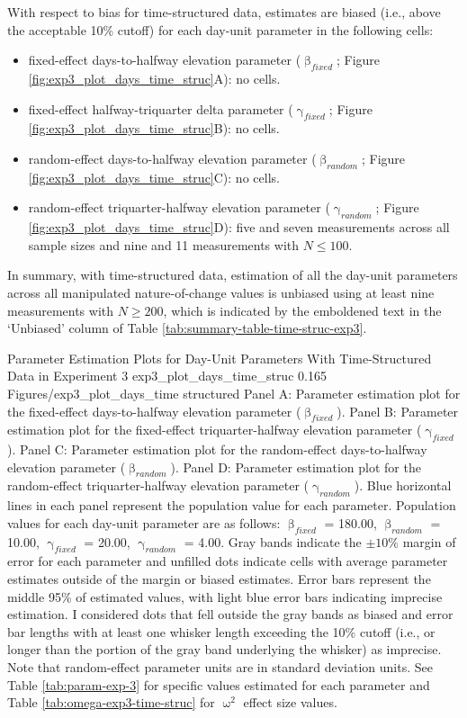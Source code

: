 \documentclass[
12pt, %
twoside,
english]{guelphthesis}
\theoremstyle{definition}
\theoremstyle{definition}
\theoremstyle{definition}
\theoremstyle{definition}
\theoremstyle{remark}
\begin{document}
With respect to bias for time-structured data, estimates are biased (i.e., above the acceptable 10\% cutoff) for each day-unit parameter in the following cells:
\begin{itemize}
\tightlist
\item
  fixed-effect days-to-halfway elevation parameter (\(\upbeta_{fixed}\); Figure \ref{fig:exp3_plot_days_time_struc}A): no cells.
\item
  fixed-effect halfway-triquarter delta parameter (\(\upgamma_{fixed}\); Figure \ref{fig:exp3_plot_days_time_struc}B): no cells.
\item
  random-effect days-to-halfway elevation parameter (\(\upbeta_{random}\); Figure \ref{fig:exp3_plot_days_time_struc}C): no cells.
\item
  random-effect triquarter-halfway elevation parameter (\(\upgamma_{random}\); Figure \ref{fig:exp3_plot_days_time_struc}D): five and seven measurements across all sample sizes and nine and 11 measurements with \(N \le 100\).
\end{itemize}
In summary, with time-structured data, estimation of all the day-unit parameters across all manipulated nature-of-change values is unbiased using at least nine measurements with \(N \ge 200\), which is indicated by the emboldened text in the `Unbiased' column of Table \ref{tab:summary-table-time-struc-exp3}.
\begin{apaFigure}
[portrait]
[samepage]
[-0.2cm]
{Parameter Estimation Plots for Day-Unit Parameters With Time-Structured Data in Experiment 3}
{exp3_plot_days_time_struc}
{0.165}
{Figures/exp3_plot_days_time structured}
{Panel A: Parameter estimation plot for the fixed-effect days-to-halfway elevation parameter ($\upbeta_{fixed}$). Panel B: Parameter estimation plot for the fixed-effect triquarter-halfway elevation parameter ($\upgamma_{fixed}$). Panel C: Parameter estimation plot for the random-effect days-to-halfway elevation parameter ($\upbeta_{random}$). Panel D: Parameter estimation plot for the random-effect triquarter-halfway elevation parameter ($\upgamma_{random}$). Blue horizontal lines in each panel represent the population value for each parameter. Population values for each day-unit parameter are as follows: $\upbeta_{fixed}$ = 180.00, $\upbeta_{random}$ = 10.00, $\upgamma_{fixed}$ = 20.00, $\upgamma_{random}$ = 4.00. Gray bands indicate the $\pm 10\%$ margin of error for each parameter and unfilled dots indicate cells with average parameter estimates outside of the margin or biased estimates. Error bars represent the middle 95\% of estimated values, with light blue error bars indicating imprecise estimation. I considered dots that fell outside the gray bands as biased and error bar lengths with at least one whisker length exceeding the 10\% cutoff (i.e., or longer than the portion of the gray band underlying the whisker) as imprecise. Note that random-effect parameter units are in standard deviation units. See Table \ref{tab:param-exp-3} for specific values estimated for each parameter and Table \ref{tab:omega-exp3-time-struc} for $\upomega^2$ effect size values.}
\end{apaFigure}
\end{document}
